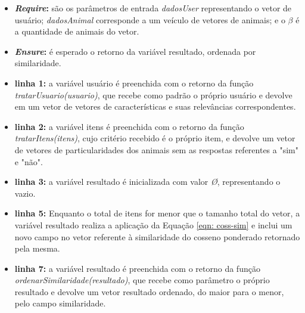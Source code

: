 \documentclass[portuguese]{textolivre}
\begin{document}
\begin{itemize}
     \item \textbf{\textit{Require}:} são os parâmetros de entrada \textit{dadosUser} representando o vetor de usuário; \textit{dadosAnimal} corresponde a um veículo de vetores de animais; e o $\beta$ é a quantidade de animais do vetor.
     
    \item \textbf{\textit{Ensure}:} é esperado o retorno da variável resultado, ordenada por similaridade.
    
    \item \textbf{linha 1:} a variável usuário é preenchida com o retorno da função \textit{tratarUsuario(usuario)}, que recebe como padrão o próprio usuário e devolve em um vetor de vetores de características e suas relevâncias correspondentes.
      
    \item \textbf{linha 2:} a variável itens é preenchida com o retorno da função \textit{tratarItens(itens)}, cujo critério recebido é o próprio item, e devolve um vetor de vetores de particularidades dos animais sem as respostas referentes a "sim" e "não".
      
    \item \textbf{linha 3:} a variável resultado é inicializada com valor \textit{Ø}, representando o vazio.
      
    \item \textbf{linha 5:} Enquanto o total de itens for menor que o tamanho total do vetor, a variável resultado realiza a aplicação da Equação \eqref{eqn: coss-sim} e inclui um novo campo  no vetor referente à similaridade do cosseno ponderado retornado pela mesma.
      
    \item \textbf{linha 7:} a variável resultado é preenchida com o retorno da função \textit{ordenarSimilaridade(resultado)}, que recebe como parâmetro o próprio resultado e devolve um vetor resultado ordenado, do maior para o menor, pelo campo similaridade.
     
\end{itemize}
\end{document}
